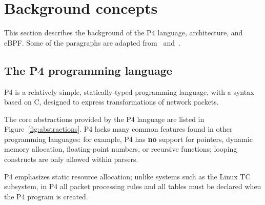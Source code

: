\section{Background concepts}\label{sec:background}
This section describes the background of the P4 language,
architecture, and eBPF. Some of the paragraphs are adapted
from~\cite{budiu-osr17} and~\cite{p4-ebpf-backend}.

\subsection{The P4 programming language}

P4 is a relatively
simple, statically-typed programming language, with a syntax based on
C, designed to express transformations of network packets.

The core abstractions provided by the P4 language are listed in
Figure~\ref{fig:abstractions}.  P4 lacks many common features found in
other programming languages: for example, P4 has \textbf{no} support
for pointers, dynamic memory allocation, floating-point numbers, or
recursive functions; looping constructs are only allowed within
parsers.

P4 emphasizes static resource allocation; unlike systems such as the
Linux TC subsystem, in P4 all packet processing rules and all tables
must be declared when the P4 program is created.

